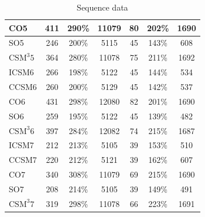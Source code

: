 \begin{table}
\begin{tabular}{| l | c | c | c | c | c | c |}
    CO5 & 411 & 290\% & 11079 & 80 & 202\% & 1690 \\\hline
    SO5 & 246 & 200\% & 5115 & 45 & 143\% & 608 \\\hline
    $\text{CSM}^{3}5$ & 364 & 280\% & 11078 & 75 & 211\% & 1692 \\\hline\hline
%
    ICSM6 & 266 & 198\% & 5122 & 45 & 144\% & 534 \\\hline
    CCSM6 & 260 & 200\% & 5129 & 45 & 142\% & 537 \\\hline
    CO6 & 431 & 298\% & 12080 & 82 & 201\% & 1690 \\\hline
    SO6 & 259 & 195\% & 5122 & 45 & 139\% & 482 \\\hline
    $\text{CSM}^{3}6$ & 397 & 284\% & 12082 & 74 & 215\% & 1687 \\\hline\hline
%
    ICSM7 & 212 & 213\% & 5105 & 39 & 153\% & 510 \\\hline
    CCSM7 & 220 & 212\% & 5121 & 39 & 162\% & 607 \\\hline
    CO7 & 340 & 308\% & 11079 & 69 & 215\% & 1690 \\\hline
    SO7 & 208 & 214\% & 5105 & 39 & 149\% & 491 \\\hline
    $\text{CSM}^{3}7$ & 319 & 298\% & 11078 & 66 & 223\% & 1691 \\\hline
  \end{tabular}
\caption{Sequence data}
\label{tab:algoseq}
\end{table}
%
